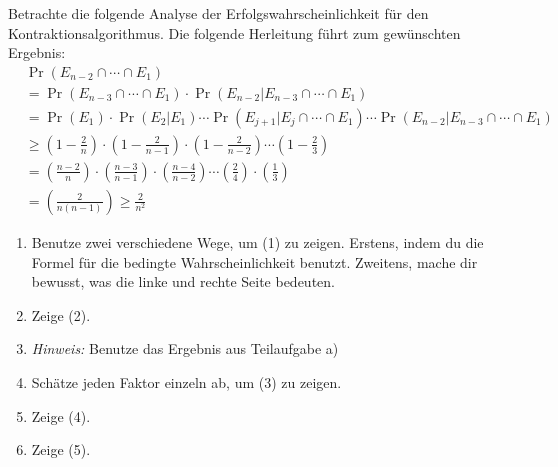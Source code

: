 \documentclass{uebung_cs}
\begin{document}
\begin{exercise}
	Betrachte die folgende Analyse der Erfolgswahrscheinlichkeit für den Kontraktionsalgorithmus. Die folgende Herleitung führt zum gewünschten Ergebnis:
	\begin{align}
		&\nonumber\Pr(E_{n-2} \cap \cdots \cap E_1) \\
		&= \Pr(E_{n-3} \cap \cdots \cap E_1) \cdot \Pr(E_{n-2}|E_{n-3} \cap \cdots \cap E_1) \\
		&= \Pr(E_1) \cdot \Pr(E_2|E_1) \cdots \Pr(E_{j+1} | E_j \cap \cdots \cap E_1) \cdots \Pr(E_{n-2} | E_{n-3} \cap \cdots \cap E_1) \\
		&\ge \left(1 - \frac{2}{n} \right) \cdot \left(1 - \frac{2}{n-1} \right) \cdot \left(1 - \frac{2}{n-2} \right) \cdots \left(1 - \frac{2}{3} \right) \\
		&= \left(\frac{n-2}{n}\right) \cdot \left(\frac{n-3}{n-1}\right) \cdot \left(\frac{n-4}{n-2}\right) \cdots \left(\frac{2}{4}\right) \cdot \left(\frac{1}{3}\right) \\
		&= \left(\frac{2}{n(n-1)}\right) \geq \frac{2}{n^2}
	\end{align}
	\begin{enumerate}
		\item Benutze zwei verschiedene Wege, um (1) zu zeigen. Erstens, indem du die Formel für die bedingte Wahrscheinlichkeit benutzt. Zweitens, mache dir bewusst, was die linke und rechte Seite bedeuten.
		\item Zeige (2). 
		\item[] \textit{Hinweis:} Benutze das Ergebnis aus Teilaufgabe a)
		\item Schätze jeden Faktor einzeln ab, um (3) zu zeigen. 
		\item Zeige (4).
		\item Zeige (5).
	\end{enumerate}
\end{exercise}
\end{document}

